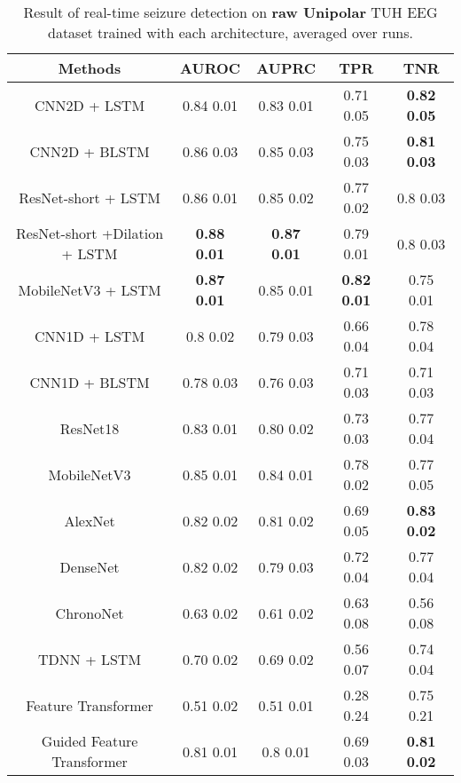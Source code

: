 \documentclass[pmlr,twocolumn,10pt]{jmlr}
\begin{document}
\begin{table*}[ht!]
	\footnotesize
	\centering
	\caption{Result of real-time seizure detection on \textbf{raw Unipolar} TUH EEG dataset trained with each architecture, averaged over  runs.}
	\label{unipolar}
	\begin{tabular}{c|cccc}
		\toprule
		Methods & AUROC & AUPRC & TPR & TNR\\\midrule
		CNN2D + LSTM & 0.84  0.01 
		& 0.83  0.01 
		& 0.71  0.05 
		& \textbf{0.82  0.05} 
		\\
		CNN2D + BLSTM 
		& 0.86  0.03 & 0.85  0.03 & 0.75  0.03 
		& \textbf{0.81  0.03 }
		\\
		ResNet-short + LSTM 
		& 0.86  0.01 
		& 0.85  0.02 
		& 0.77  0.02 
		& 0.8  0.03 
		\\
		
		ResNet-short +Dilation + LSTM 
		& \textbf{0.88  0.01}
		& \textbf{0.87  0.01}
		& 0.79  0.01 
		& 0.8  0.03
		\\
		
		MobileNetV3 + LSTM 
		& \textbf{0.87  0.01 }
		& 0.85  0.01 
		& \textbf{0.82  0.01}
		& 0.75  0.01
		\\
		
		\midrule
		CNN1D + LSTM & 0.8  0.02  & 0.79  0.03  & 0.66  0.04 & 0.78  0.04\\
		CNN1D + BLSTM & 0.78  0.03 & 0.76  0.03 & 0.71  0.03  & 0.71  0.03\\
		\midrule
		ResNet18 & 0.83  0.01 & 0.80  0.02 & 0.73  0.03 & 0.77  0.04\\
		
		MobileNetV3 
		& 0.85  0.01 
		& 0.84  0.01 
		& 0.78  0.02 
		& 0.77  0.05\\
		
		AlexNet 
		& 0.82  0.02 
		& 0.81  0.02 
		& 0.69  0.05 
		& \textbf{0.83  0.02}
		\\
		DenseNet 
		& 0.82  0.02 
		& 0.79  0.03 
		& 0.72  0.04 
		& 0.77  0.04
		\\
		
		ChronoNet & 0.63  0.02 & 0.61  0.02 & 0.63  0.08 & 0.56  0.08\\
		TDNN + LSTM & 0.70  0.02 & 0.69  0.02 & 0.56  0.07 & 0.74  0.04\\
		\midrule
		Feature Transformer & 0.51   0.02 & 0.51  0.01  & 0.28  0.24 &  0.75  0.21\\
		Guided Feature Transformer  & 0.81  0.01  & 0.8  0.01  & 0.69  0.03 
		& \textbf{0.81  0.02}\\
		\bottomrule
	\end{tabular}
\end{table*} 
\end{document}
